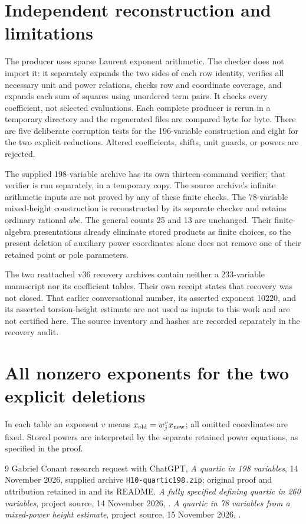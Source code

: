 \documentclass[11pt,a4paper]{article}
\begin{document}
\section{Independent reconstruction and limitations}\label{sec:verification}
The producer uses sparse Laurent exponent arithmetic. The checker does not
import it: it separately expands the two sides of each row identity,
verifies all necessary unit and power relations, checks row and coordinate
coverage, and expands each sum of squares using unordered term pairs.
It checks every coefficient, not selected evaluations. Each complete
producer is rerun in a temporary directory and the regenerated files are
compared byte for byte. There are five deliberate corruption tests for
the 196-variable construction and eight for the two explicit reductions.
Altered coefficients, shifts, unit guards, or powers are rejected.

The supplied 198-variable archive has its own thirteen-command verifier;
that verifier is run separately, in a temporary copy. The source archive's
infinite arithmetic inputs are not proved by any of these finite checks.
The 78-variable mixed-height construction is reconstructed by its separate
checker and retains ordinary rational $abc$. The general counts 25 and
13 are unchanged. Their finite-algebra presentations already eliminate
stored products as finite choices, so the present deletion of auxiliary
power coordinates alone does not remove one of their retained point or
pole parameters.

The two reattached v36 recovery archives contain neither a 233-variable
manuscript nor its coefficient tables. Their own receipt states that
recovery was not closed. That earlier conversational number, its asserted
exponent 10220, and its asserted torsion-height estimate are not used as
inputs to this work and are not certified here. The source inventory and
hashes are recorded separately in the recovery audit.

\appendix
\section{All nonzero exponents for the two explicit deletions}\label{app:weights}
In each table an exponent $v$ means $x_{\rm old}=w_j^v x_{\rm new}$;
all omitted coordinates are fixed. Stored powers are interpreted by the
separate retained power equations, as specified in the proof.


\begin{thebibliography}{9}
 Gabriel Conant research request with ChatGPT,
\emph{A quartic in 198 variables}, 14 November 2026, supplied archive
\texttt{H10-quartic198.zip}; original proof and attribution retained in
 and its README.
 \emph{A fully specified defining quartic in 260 variables},
project source, 14 November 2026,
.
 \emph{A quartic in 78 variables from a mixed-power height estimate},
project source, 15 November 2026,
.
\end{thebibliography}
\end{document}
